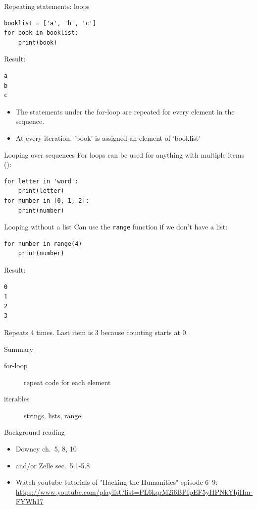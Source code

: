 \documentclass[aspectratio=169,usenames,dvipsnames]{beamer}
\begin{document}
\begin{frame}[fragile]{Repeating statements: loops}
\begin{lstlisting}
booklist = ['a', 'b', 'c']
for book in booklist:
    print(book)
\end{lstlisting}
Result:
\begin{lstlisting}
a
b
c
\end{lstlisting}

\begin{itemize}
\item The statements under the for-loop are repeated
    for every element in the sequence.
\item At every iteration, 'book' is assigned an element of 'booklist'
\end{itemize}
\end{frame}

\begin{frame}[fragile]{Looping over sequences}
For loops can be used for anything with multiple items ():
\begin{lstlisting}
for letter in 'word':
    print(letter)
for number in [0, 1, 2]:
    print(number)
\end{lstlisting}
\end{frame}



\begin{frame}[fragile]{Looping without a list}
Can use the \texttt{range} function if we don't have a list:
\begin{lstlisting}
for number in range(4)
    print(number)
\end{lstlisting}

Result:
\begin{lstlisting}
0
1
2
3
\end{lstlisting}

Repeats 4 times. Last item is 3 because counting starts at 0.
\end{frame}

\begin{frame}{Summary}
    \begin{description}
        \item[for-loop] repeat code for each element
        \item[iterables] strings, lists, range
    \end{description}
\end{frame}

\begin{frame}{Background reading}
    \begin{itemize}
        \item Downey ch.\ 5, 8, 10
        \item and/or Zelle sec.\ 5.1-5.8
        \item Watch youtube tutorials of "Hacking the Humanities" episode 6--9:
            \url{https://www.youtube.com/playlist?list=PL6kqrM2i6BPIpEF5yHPNkYhjHm-FYWh17}
    \end{itemize}
\end{frame}
\end{document}
